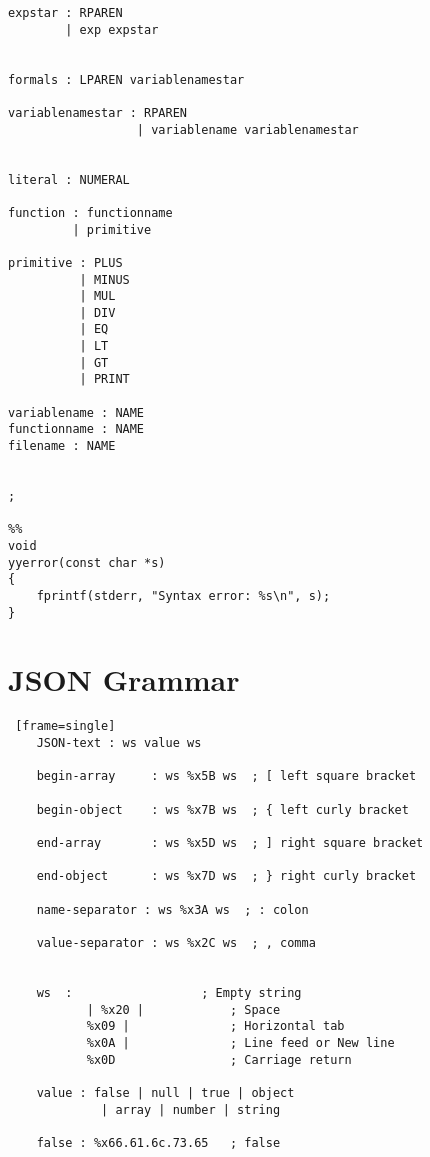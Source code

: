 \begin{appendices}
\begin{Verbatim}[frame=single]
expstar : RPAREN                                    
        | exp expstar                                
                                                     

formals : LPAREN variablenamestar                  

variablenamestar : RPAREN                           
                  | variablename variablenamestar 


literal : NUMERAL           

function : functionname           
         | primitive              

primitive : PLUS                  
          | MINUS                                 
          | MUL                    
          | DIV                    
          | EQ                     
          | LT                     
          | GT                     
          | PRINT                  

variablename : NAME 
functionname : NAME 
filename : NAME  


;

%%
void
yyerror(const char *s)
{
    fprintf(stderr, "Syntax error: %s\n", s);
}

\end{Verbatim}

\section{JSON Grammar}

\begin{Verbatim} [frame=single]
    JSON-text : ws value ws

	begin-array     : ws %x5B ws  ; [ left square bracket

	begin-object    : ws %x7B ws  ; { left curly bracket

	end-array       : ws %x5D ws  ; ] right square bracket

	end-object      : ws %x7D ws  ; } right curly bracket

	name-separator : ws %x3A ws  ; : colon

	value-separator : ws %x2C ws  ; , comma


	ws  :	               ; Empty string
		   | %x20 |            ; Space
		   %x09 |              ; Horizontal tab
		   %x0A |              ; Line feed or New line
		   %x0D                ; Carriage return

	value : false | null | true | object
			 | array | number | string

	false : %x66.61.6c.73.65   ; false


\end{Verbatim}
\end{appendices}
